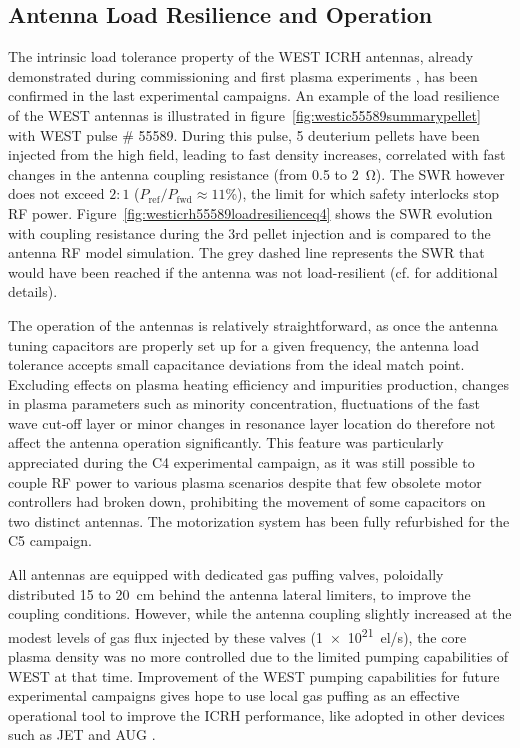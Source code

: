 \documentclass[12p]{iopart}
\begin{document}
\subsection{Antenna Load Resilience and Operation}
The intrinsic load tolerance property of the WEST ICRH antennas, already demonstrated during commissioning and first plasma experiments \cite{helou2020}, has been confirmed in the last experimental campaigns. An example of the load resilience of the WEST antennas is illustrated in figure~\ref{fig:westic55589summarypellet} with WEST pulse \# 55589. During this pulse, 5 deuterium pellets have been injected from the high field, leading to fast density increases, correlated with fast changes in the antenna coupling resistance (from 0.5 to \SI{2}{\ohm}). The SWR however does not exceed $2{:}1$ ($P_{\mathrm{ref}}/P_{\mathrm{fwd}} \approx 11$\%), the limit for which safety interlocks stop RF power. Figure~\ref{fig:westicrh55589loadresilienceq4} shows the SWR evolution with coupling resistance during the 3rd pellet injection and is compared to the antenna RF model simulation. The grey dashed line represents the SWR that would have been reached if the antenna was not load-resilient (cf.\cite{helou2020} for additional details). 

The operation of the antennas is relatively straightforward, as once the antenna tuning capacitors are properly set up for a given frequency, the antenna load tolerance accepts small capacitance deviations from the ideal match point. Excluding effects on plasma heating efficiency and impurities production, changes in plasma parameters such as minority concentration, fluctuations of the fast wave cut-off layer or minor changes in resonance layer location do therefore not affect the antenna operation significantly. This feature was particularly appreciated during the C4 experimental campaign, as it was still possible to couple RF power to various plasma scenarios despite that few obsolete motor controllers had broken down, prohibiting the movement of some capacitors on two distinct antennas. The motorization system has been fully refurbished for the C5 campaign. 

All antennas are equipped with dedicated gas puffing valves, poloidally distributed 15 to \SI{20}{\centi\meter} behind the antenna lateral limiters, to improve the coupling conditions. However, while the antenna coupling slightly increased at the modest levels of gas flux injected by these valves (\SI{1e21}{el/\second}), the core plasma density was no more controlled due to the limited pumping capabilities of WEST at that time. Improvement of the WEST pumping capabilities for future experimental campaigns gives hope to use local gas puffing as an effective operational tool to improve the ICRH performance, like adopted in other devices such as JET and AUG \cite{jacquet2016, lerche2016}.
\end{document}
